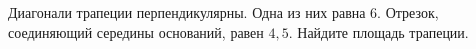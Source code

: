 \begin{ex}
	\begin{condition}
		Диагонали трапеции перпендикулярны. Одна из них равна \( 6 \). Отрезок, соединяющий середины оснований, равен \( 4,5 \). Найдите площадь трапеции.
	\end{condition}
\end{ex}